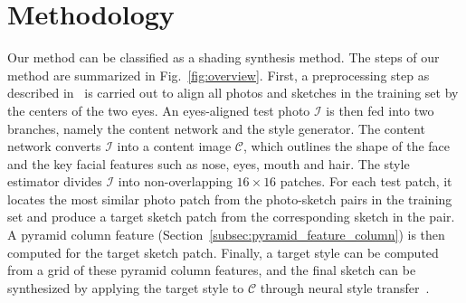 \documentclass[10pt,twocolumn,letterpaper]{article}
\begin{document}
\section{Methodology}
Our method can be classified as a shading synthesis method. The steps of our method are summarized in Fig.~\ref{fig:overview}. First, a preprocessing step as described in~\cite{wang2009face} is carried out to align all photos and sketches in the training set by the centers of the two eyes. An eyes-aligned test photo $\mathcal{I}$ is then fed into two branches, namely the content network and the style generator. The content network converts $\mathcal{I}$ into a content image $\mathcal{C}$, which outlines the shape of the face and the key facial features such as nose, eyes, mouth and hair. The style estimator divides $\mathcal{I}$ into non-overlapping $16\times16$ patches. For each test patch, it locates the most similar photo patch from the photo-sketch pairs in the training set and produce a target sketch patch from the corresponding sketch in the pair. A pyramid column feature (Section~\ref{subsec:pyramid_feature_column}) is then computed for the target sketch patch. Finally, a target style can be computed from a grid of these pyramid column features, and the final sketch can be synthesized by applying the target style to $\mathcal{C}$ through neural style transfer~\cite{gatys2015neural}. 

\end{document}
